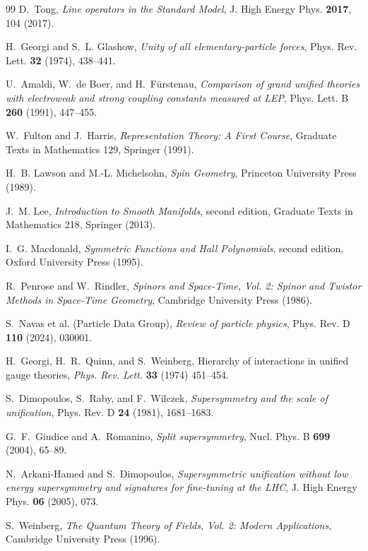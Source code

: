 \documentclass[11pt]{article}
\theoremstyle{definition}
\begin{document}
\begin{thebibliography}{99}
D.~Tong,
\emph{Line operators in the Standard Model},
J. High Energy Phys. \textbf{2017}, 104 (2017).

H.~Georgi and S.~L. Glashow,
\emph{Unity of all elementary-particle forces},
Phys. Rev. Lett. \textbf{32} (1974), 438--441.

U.~Amaldi, W.~de Boer, and H.~F\"urstenau,
\emph{Comparison of grand unified theories with electroweak and strong coupling constants measured at LEP},
Phys. Lett. B \textbf{260} (1991), 447--455.

W.~Fulton and J.~Harris,
\emph{Representation Theory: A First Course},
Graduate Texts in Mathematics 129, Springer (1991).

H.~B. Lawson and M.-L. Michelsohn,
\emph{Spin Geometry},
Princeton University Press (1989).

J.~M. Lee,
\emph{Introduction to Smooth Manifolds}, second edition,
Graduate Texts in Mathematics 218, Springer (2013).

I.~G. Macdonald,
\emph{Symmetric Functions and Hall Polynomials}, second edition,
Oxford University Press (1995).

R.~Penrose and W.~Rindler,
\emph{Spinors and Space-Time, Vol. 2: Spinor and Twistor Methods in Space-Time Geometry},
Cambridge University Press (1986).

S.~Navas et al. (Particle Data Group),
\emph{Review of particle physics},
Phys. Rev. D \textbf{110} (2024), 030001.

H.~Georgi, H.~R.~Quinn, and S.~Weinberg,
Hierarchy of interactions in unified gauge theories,
\emph{Phys. Rev. Lett.} \textbf{33} (1974) 451--454.

S.~Dimopoulos, S.~Raby, and F.~Wilczek,
\emph{Supersymmetry and the scale of unification},
Phys. Rev. D \textbf{24} (1981), 1681--1683.

G.~F.~Giudice and A.~Romanino,
\emph{Split supersymmetry},
Nucl. Phys. B \textbf{699} (2004), 65--89.

N.~Arkani-Hamed and S.~Dimopoulos,
\emph{Supersymmetric unification without low energy supersymmetry and signatures for fine-tuning at the LHC},
J. High Energy Phys. \textbf{06} (2005), 073.

S.~Weinberg,
\emph{The Quantum Theory of Fields, Vol. 2: Modern Applications},
Cambridge University Press (1996).


\end{thebibliography}
\end{document}
